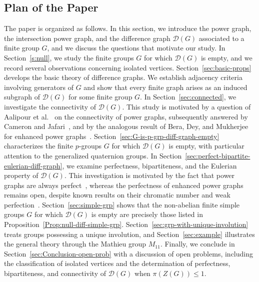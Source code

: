 \documentclass[12pt]{amsart}
\theoremstyle{plain}
\theoremstyle{remark}
\theoremstyle{definition}
\begin{document}
\subsection{Plan of the Paper}

The paper is organized as follows. In this section, we introduce the power graph, the intersection power graph, and the difference graph $\mathcal{D}(G)$ associated to a finite group $G$, and we discuss the questions that motivate our study.
In Section~\ref{s:null}, we study the finite groups $G$ for which $\mathcal{D}(G)$ is empty, and we record several observations concerning isolated vertices.
Section~\ref{sec:basic-props} develops the basic theory of difference graphs. We establish adjacency criteria involving generators of $G$ and show that every finite graph arises as an induced subgraph of $\mathcal{D}(G)$ for some finite group $G$.
In Section~\ref{sec:connected}, we investigate the connectivity of $\mathcal{D}(G)$. This study is motivated by a question of Aalipour et al.~\cite[Question~40]{aacns} on the connectivity of power graphs, subsequently answered by Cameron and Jafari~\cite{cj}, and by the analogous result of Bera, Dey, and Mukherjee for enhanced power graphs~\cite{Bera-Dey-Mukherjee}.
Section~\ref{sec:G-is-p-grp-diff-graph-empty} characterizes the finite $p$-groups $G$ for which $\mathcal{D}(G)$ is empty, with particular attention to the generalized quaternion groups.
In Section~\ref{sec:perfect-bipartite-eulerian-diff-graph}, we examine perfectness, bipartiteness, and the Eulerian property of $\mathcal{D}(G)$. This investigation is motivated by the fact that power graphs are always perfect~\cite[Thm.~5]{AAA}, whereas the perfectness of enhanced power graphs remains open, despite known results on their chromatic number and weak perfection~\cite{Cameron-Veronica}.
Section~\ref{sec:simple-grp} shows that the non-abelian finite simple groups $G$ for which $\mathcal{D}(G)$ is empty are precisely those listed in Proposition~\ref{Prop:null-diff-simple-grp}.
Section~\ref{sec:grp-with-unique-involution} treats groups possessing a unique involution, and Section~\ref{sec:example} illustrates the general theory through the Mathieu group $M_{11}$. Finally, we conclude in Section~\ref{sec:Conclusion-open-prob} with a discussion of open problems, including the classification of isolated vertices and the determination of perfectness, bipartiteness, and connectivity of $\mathcal{D}(G)$ when $\pi(Z(G)) \leq 1$.
\end{document}
